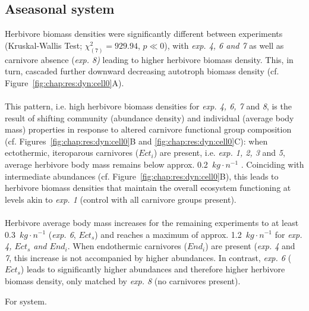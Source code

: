 \subsection{Aseasonal system}
\label{chap:res:popind:cell0}
Herbivore biomass densities were significantly different between experiments  (Kruskal-Wallis Test; $\chi^{2}_{(7)} = 929.94$, $p \ll 0$), with \textit{exp. 4, 6 and 7} as well as carnivore absence (\textit{exp. 8)} leading to higher herbivore biomass density. 
This, in turn, cascaded further downward decreasing autotroph biomass density (cf. Figure~\ref{fig:chap:res:dyn:cell0}A).
\\\\
This pattern, i.e. high herbivore biomass densities for \textit{exp. 4, 6, 7} and \textit{8}, is the result of shifting community (abundance density) and individual (average body mass) properties in response to altered carnivore functional group composition (cf. Figures~\ref{fig:chap:res:dyn:cell0}B and \ref{fig:chap:res:dyn:cell0}C): when ectothermic, iteroparous carnivores ($Ect_i$) are present, i.e. \textit{exp. 1, 2, 3} and \textit{5}, average herbivore body mass remains below approx. 0.2~$kg\cdot n^{-1}$ . 
Coinciding with intermediate abundances (cf. Figure~\ref{fig:chap:res:dyn:cell0}B), 
this leads to herbivore biomass densities that maintain the overall ecosystem functioning at levels akin to \textit{exp. 1} (control with all carnivore groups present).\\\\
Herbivore average body mass increases for the remaining experiments to at least 0.3~$kg\cdot n^{-1}$ (\textit{exp. 6}, $Ect_s$) and reaches a maximum of approx. 1.2~$kg\cdot n^{-1}$ for \textit{exp. 4, $Ect_s$ and $End_i$}. 
When endothermic carnivores ($End_i$) are present (\textit{exp. 4} and \textit{7}, this increase is not accompanied by higher abundances. 
In contrast, \textit{exp. 6} ($Ect_s$) leads to significantly higher abundances and therefore higher herbivore biomass density, only matched by \textit{exp. 8} (no carnivores present).


For   system. 

